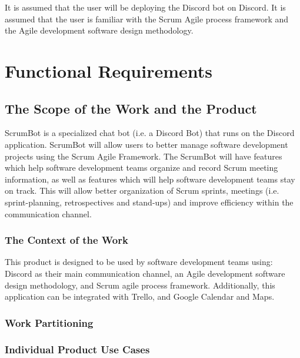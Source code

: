 \documentclass[12pt, titlepage]{article}
\begin{document}
It is assumed that the user will be deploying the Discord bot on Discord. It is assumed that the user is familiar with the Scrum Agile process framework and the Agile development software design methodology.

\section{Functional Requirements}

\subsection{The Scope of the Work and the Product}
ScrumBot is a specialized chat bot (i.e. a Discord Bot) that runs on the Discord application. ScrumBot will allow users to better manage software development projects using the Scrum Agile Framework. The ScrumBot will have features which help software development teams organize and record Scrum meeting information, as well as features which will help software development teams stay on track. This will allow better organization of Scrum sprints, meetings  (i.e. sprint-planning, retrospectives  and  stand-ups) and  improve  efficiency  within  the communication channel.

\subsubsection{The Context of the Work}
This product is designed to be used by software development teams using: Discord as their main communication channel, an Agile development software design methodology, and Scrum agile process framework. Additionally, this application can be integrated with Trello, and Google Calendar and Maps.

\subsubsection{Work Partitioning}

\subsubsection{Individual Product Use Cases}
\end{document}
